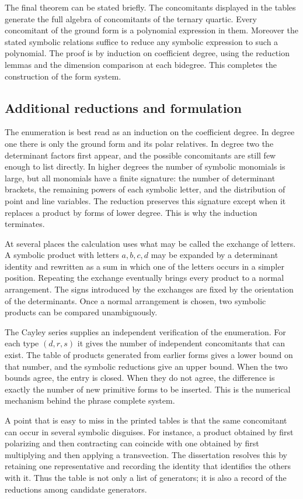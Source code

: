 \documentclass[11pt]{article}
\begin{document}
The final theorem can be stated briefly. The concomitants displayed in the tables generate the full
algebra of concomitants of the ternary quartic. Every concomitant of the ground form is a polynomial
expression in them. Moreover the stated symbolic relations suffice to reduce any symbolic expression
to such a polynomial. The proof is by induction on coefficient degree, using the reduction lemmas
and the dimension comparison at each bidegree. This completes the construction of the form system.


\subsection{Additional reductions and formulation}

The enumeration is best read as an induction on the coefficient degree. In degree one there is only
the ground form and its polar relatives. In degree two the determinant factors first appear, and the
possible concomitants are still few enough to list directly. In higher degrees the number of
symbolic monomials is large, but all monomials have a finite signature: the number of determinant
brackets, the remaining powers of each symbolic letter, and the distribution of point and line
variables. The reduction preserves this signature except when it replaces a product by forms of
lower degree. This is why the induction terminates.

At several places the calculation uses what may be called the exchange of letters. A symbolic
product with letters \(a,b,c,d\) may be expanded by a determinant identity and rewritten as a sum in
which one of the letters occurs in a simpler position. Repeating the exchange eventually brings
every product to a normal arrangement. The signs introduced by the exchanges are fixed by the
orientation of the determinants. Once a normal arrangement is chosen, two symbolic products can be
compared unambiguously.

The Cayley series supplies an independent verification of the enumeration. For each type \((d,r,s)\)
it gives the number of independent concomitants that can exist. The table of products generated from
earlier forms gives a lower bound on that number, and the symbolic reductions give an upper bound.
When the two bounds agree, the entry is closed. When they do not agree, the difference is exactly
the number of new primitive forms to be inserted. This is the numerical mechanism behind the phrase
complete system.

A point that is easy to miss in the printed tables is that the same concomitant can occur in several
symbolic disguises. For instance, a product obtained by first polarizing and then contracting can
coincide with one obtained by first multiplying and then applying a transvection. The dissertation
resolves this by retaining one representative and recording the identity that identifies the others
with it. Thus the table is not only a list of generators; it is also a record of the reductions
among candidate generators.
\end{document}
